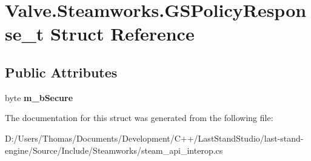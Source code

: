 \hypertarget{structValve_1_1Steamworks_1_1GSPolicyResponse__t}{}\section{Valve.\+Steamworks.\+G\+S\+Policy\+Response\+\_\+t Struct Reference}
\label{structValve_1_1Steamworks_1_1GSPolicyResponse__t}
\subsection*{Public Attributes}
\begin{DoxyCompactItemize}
\item 
\hypertarget{structValve_1_1Steamworks_1_1GSPolicyResponse__t_a5c0f6aac3e1c81ee6deb98b7ba4fcaa0}{}byte {\bfseries m\+\_\+b\+Secure}\label{structValve_1_1Steamworks_1_1GSPolicyResponse__t_a5c0f6aac3e1c81ee6deb98b7ba4fcaa0}

\end{DoxyCompactItemize}


The documentation for this struct was generated from the following file\+:\begin{DoxyCompactItemize}
\item 
D\+:/\+Users/\+Thomas/\+Documents/\+Development/\+C++/\+Last\+Stand\+Studio/last-\/stand-\/engine/\+Source/\+Include/\+Steamworks/steam\+\_\+api\+\_\+interop.\+cs\end{DoxyCompactItemize}
